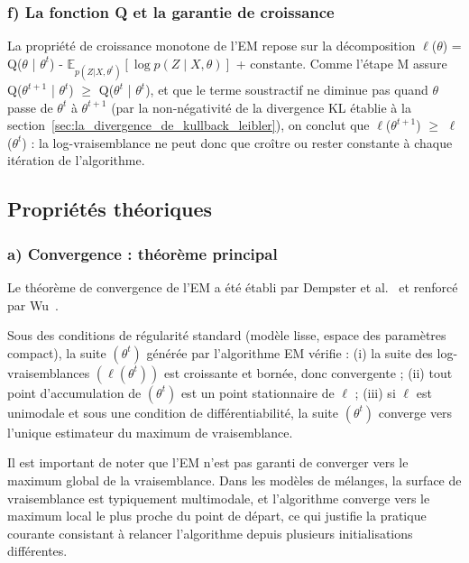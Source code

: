 \subsubsection{f) La fonction Q et la garantie de croissance}\label{sec:f_la_fonction_q_et}
La propriété de croissance monotone de l'EM repose sur la décomposition $\ell $($\theta $) = Q($\theta $ | $\theta ^{t}$) - $\mathbb{E}_{p(Z|X,\theta^{t})}[\log p(Z \mid X, \theta)]$ + constante. Comme l'étape M assure Q($\theta ^{t+1}$ | $\theta ^{t}$) $\geq $ Q($\theta ^{t}$ | $\theta ^{t}$), et que le terme soustractif ne diminue pas quand $\theta $ passe de $\theta ^{t}$ à $\theta ^{t+1}$ (par la non-négativité de la divergence KL établie à la section~\ref{sec:la_divergence_de_kullback_leibler}), on conclut que $\ell $($\theta ^{t+1}$) $\geq $ $\ell $($\theta ^{t}$) : la log-vraisemblance ne peut donc que croître ou rester constante à chaque itération de l'algorithme.

\subsection{Propriétés théoriques}\label{sec:proprietes_em}
\subsubsection{a) Convergence : théorème principal}\label{sec:a_convergence_theoreme_principal}
Le théorème de convergence de l'EM a été établi par Dempster et al.~\cite{dempster1977} et renforcé par Wu~\cite{wu1983}.

\begin{theoreme}[Convergence de l'EM]\label{thm:wu}
Sous des conditions de régularité standard (modèle lisse, espace des paramètres compact), la suite $(\theta^{t})$ générée par l'algorithme EM vérifie : (i) la suite des log-vraisemblances $(\ell(\theta^{t}))$ est croissante et bornée, donc convergente ; (ii) tout point d'accumulation de $(\theta^{t})$ est un point stationnaire de $\ell$ ; (iii) si $\ell$ est unimodale et sous une condition de différentiabilité, la suite $(\theta^{t})$ converge vers l'unique estimateur du maximum de vraisemblance.
\end{theoreme}

Il est important de noter que l'EM n'est pas garanti de converger vers le maximum global de la vraisemblance. Dans les modèles de mélanges, la surface de vraisemblance est typiquement multimodale, et l'algorithme converge vers le maximum local le plus proche du point de départ, ce qui justifie la pratique courante consistant à relancer l'algorithme depuis plusieurs initialisations différentes.

